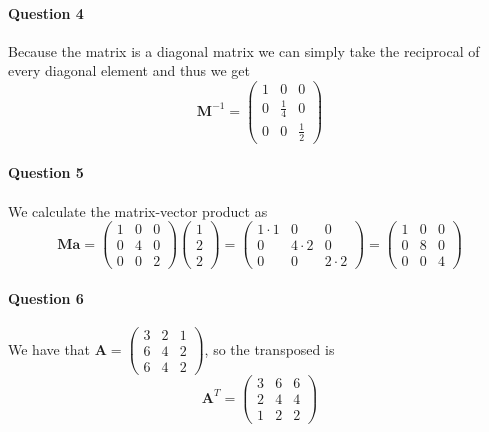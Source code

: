 \documentclass[a4paper, 11pt]{article}
\newcommand{\vect}[1]{\textbf{#1}}
\newcommand{\mat}[1]{\textbf{#1}}
\begin{document}
\paragraph{Question 4}
Because the matrix is a diagonal matrix we can simply take the reciprocal of every diagonal element and thus we get
\[
    \mat M^{-1} = 
    \begin{pmatrix}
        1 & 0 & 0 \\
        0 & \frac{1}{4} & 0 \\
        0 & 0 & \frac{1}{2}
    \end{pmatrix}
\]

\paragraph{Question 5}
We calculate the matrix-vector product as
\[
    \mat M \vect a =
    \begin{pmatrix}
        1 & 0 & 0 \\
        0 & 4 & 0 \\
        0 & 0 & 2
    \end{pmatrix}
    \begin{pmatrix}
        1 \\ 2 \\ 2
    \end{pmatrix} =
    \begin{pmatrix}
        1 \cdot 1 & 0 & 0 \\
        0 & 4 \cdot 2 & 0 \\
        0 & 0 & 2 \cdot 2
    \end{pmatrix} = 
    \begin{pmatrix}
        1 & 0 & 0 \\
        0 & 8 & 0 \\
        0 & 0 & 4
    \end{pmatrix}
\]


\paragraph{Question 6}
We have that $\mat A = 
                \begin{pmatrix} 
                    3 & 2 & 1\\
                    6 & 4 & 2\\
                    6 & 4 & 2
                \end{pmatrix}$, so the transposed is
\[
    \mat A^T = \begin{pmatrix} 
                    3 & 6 & 6\\
                    2 & 4 & 4\\
                    1 & 2 & 2
                \end{pmatrix}
\]
\end{document}
